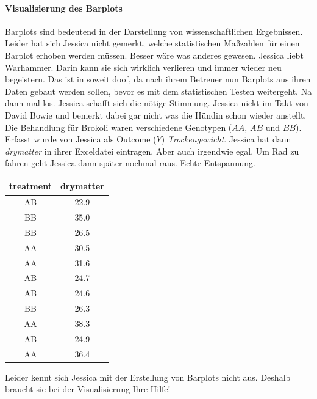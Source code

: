 \documentclass[a4paper, 9pt]{scrartcl}\usepackage[]{graphicx}\usepackage[]{xcolor}
\begin{document}
\ifcollection
\paragraph{Visualisierung des Barplots}
\fi

Barplots sind bedeutend in der Darstellung von wissenschaftlichen Ergebnissen. Leider hat sich Jessica nicht gemerkt, welche statistischen Maßzahlen für einen Barplot erhoben werden müssen. Besser wäre was anderes gewesen. Jessica liebt Warhammer. Darin kann sie sich wirklich verlieren und immer wieder neu begeistern. Das ist in soweit doof, da nach ihrem Betreuer nun Barplots aus ihren Daten gebaut werden sollen, bevor es mit dem statistischen Testen weitergeht. Na dann mal los. Jessica schafft sich die nötige Stimmung. Jessica nickt im Takt von David Bowie und bemerkt dabei gar nicht was die Hündin schon wieder anstellt. Die Behandlung für Brokoli waren verschiedene Genotypen ($AA$, $AB$ und $BB$). Erfasst wurde von Jessica als Outcome ($Y$) \textit{Trockengewicht}. Jessica hat dann \textit{drymatter} in ihrer Exceldatei eintragen. Aber auch irgendwie egal. Um Rad zu fahren geht Jessica dann später nochmal raus. Echte Entspannung.

\begin{table}[!h]
\centering
\begin{tabular}{cc}
\toprule
treatment & drymatter\\
\midrule
AB & 22.9\\
BB & 35.0\\
BB & 26.5\\
AA & 30.5\\
AA & 31.6\\
\addlinespace
AB & 24.7\\
AB & 24.6\\
BB & 26.3\\
AA & 38.3\\
AB & 24.9\\
\addlinespace
AA & 36.4\\
\bottomrule
\end{tabular}
\end{table}



Leider kennt sich Jessica mit der Erstellung von Barplots nicht aus. Deshalb braucht sie bei der Visualisierung Ihre Hilfe!
\end{document}
